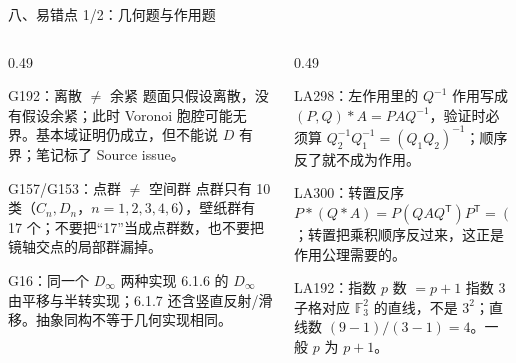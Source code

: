 \documentclass[aspectratio=169,10pt,fontset=none]{ctexbeamer}
\begin{document}
\begin{frame}[t]{八、易错点 1/2：几何题与作用题}
  \label{sec:pitfalls}
  \begin{columns}[T,onlytextwidth]
    \begin{column}{0.49\textwidth}
      \begin{alertblock}{\footnotesize G192：离散 $\ne$ 余紧}
        \scriptsize
        题面只假设离散，没有假设余紧；此时 Voronoi 胞腔可能无界。基本域证明仍成立，但不能说 $D$ 有界；笔记标了 Source issue。
      \end{alertblock}
      \begin{alertblock}{\footnotesize G157/G153：点群 $\ne$ 空间群}
        \scriptsize
        点群只有 10 类（$C_n,D_n$，$n=1,2,3,4,6$），壁纸群有 17 个；不要把“17”当成点群数，也不要把镜轴交点的局部群漏掉。
      \end{alertblock}
      \begin{alertblock}{\footnotesize G16：同一个 $D_\infty$ 两种实现}
        \scriptsize
        6.1.6 的 $D_\infty$ 由平移与半转实现；6.1.7 还含竖直反射/滑移。抽象同构不等于几何实现相同。
      \end{alertblock}
    \end{column}
    \begin{column}{0.49\textwidth}
      \begin{alertblock}{\footnotesize LA298：左作用里的 $Q^{-1}$}
        \scriptsize
        作用写成 $(P,Q)*A=PAQ^{-1}$，验证时必须算 $Q_2^{-1}Q_1^{-1}=(Q_1Q_2)^{-1}$；顺序反了就不成为作用。
      \end{alertblock}
      \begin{alertblock}{\footnotesize LA300：转置反序}
        \scriptsize
        $P*(Q*A)=P(QAQ^{\mathsf T})P^{\mathsf T}=(PQ)A(PQ)^{\mathsf T}$；转置把乘积顺序反过来，这正是作用公理需要的。
      \end{alertblock}
      \begin{alertblock}{\footnotesize LA192：指数 $p$ 数 $=p+1$}
        \scriptsize
        指数 3 子格对应 $\mathbb F_3^2$ 的直线，不是 $3^2$；直线数 $(9-1)/(3-1)=4$。一般 $p$ 为 $p+1$。
      \end{alertblock}
    \end{column}
  \end{columns}
\end{frame}
\end{document}
